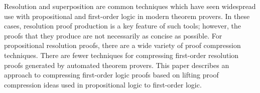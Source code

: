 Resolution and superposition are common techniques which have seen widespread use with propositional and first-order logic in modern theorem provers. In these cases, resolution proof production is a key feature of such tools; however, the proofs that they produce are not necessarily as concise as possible.
For propositional resolution proofs, there are a wide variety of proof compression techniques. There are fewer techniques for compressing first-order resolution proofs generated by automated theorem provers.
This paper describes an approach to compressing first-order logic proofs based on lifting proof compression ideas used in propositional logic to first-order logic. 





